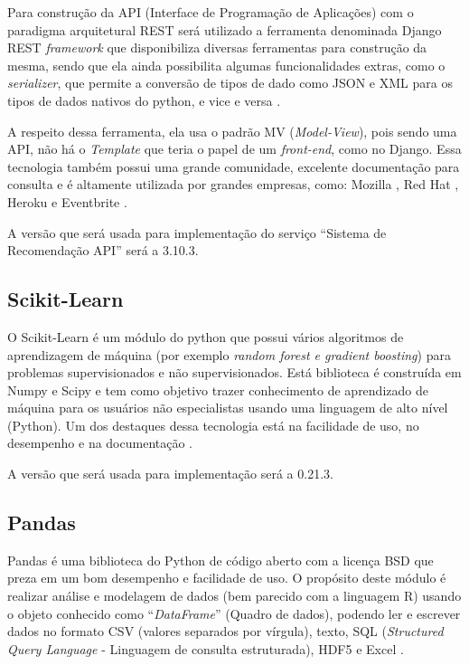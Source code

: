 Para construção da API (Interface de Programação de Aplicações) com o paradigma arquitetural REST será utilizado a ferramenta denominada Django REST \textit{framework} que disponibiliza diversas ferramentas para construção da mesma, sendo que ela ainda possibilita algumas funcionalidades extras, como o \textit{serializer}, que permite a conversão de tipos de dado como JSON e XML para os tipos de dados nativos do python, e vice e versa \cite{DjangoRest:2019}.

A respeito dessa ferramenta, ela usa o padrão MV (\textit{Model-View}), pois sendo uma API, não há o \textit{Template} que teria o papel de um \textit{front-end}, como no Django. Essa tecnologia também possui uma grande comunidade, excelente documentação para consulta e é altamente utilizada por grandes empresas, como:  Mozilla , Red Hat , Heroku e Eventbrite \cite{DjangoRest:2019}.

A versão que será usada para implementação do serviço “Sistema de Recomendação API” será a 3.10.3.

\subsection{Scikit-Learn}
\label{scikit_learn}

O Scikit-Learn é um módulo do python que possui vários algoritmos de aprendizagem de máquina (por exemplo \textit{random forest e gradient boosting}) para problemas supervisionados e não supervisionados. Está biblioteca é construída em Numpy e Scipy e tem como objetivo trazer conhecimento de aprendizado de máquina para os usuários não especialistas usando uma linguagem de alto nível (Python). Um dos destaques dessa tecnologia está na facilidade de uso, no desempenho e na documentação \cite{PREDEGOSA:2011}.

A versão que será usada para implementação será a 0.21.3.

\subsection{Pandas}

Pandas é uma biblioteca do Python de código aberto com a licença BSD que preza em um bom desempenho e facilidade de uso. O propósito deste módulo é realizar análise e modelagem de dados (bem parecido com a linguagem R) usando o objeto conhecido como “\textit{DataFrame}” (Quadro de dados), podendo ler e escrever dados no formato CSV (valores separados por vírgula), texto, SQL (\textit{Structured Query Language} - Linguagem de consulta estruturada), HDF5 e Excel \cite{pandas:2019}.

